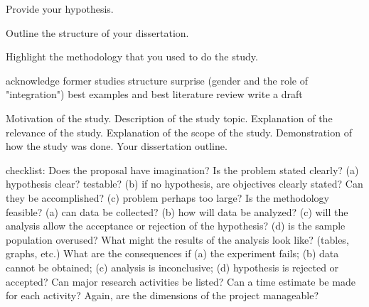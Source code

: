 Provide your hypothesis.

Outline the structure of your dissertation.

Highlight the methodology that you used to do the study.


acknowledge former studies
structure
surprise (gender and the role of "integration")
best examples and best literature review
write a draft

Motivation of the study.
Description of the study topic.
Explanation of the relevance of the study.
Explanation of the scope of the study.
Demonstration of how the study was done.
Your dissertation outline.


checklist:
Does the proposal have imagination?
Is the problem stated clearly?
(a) hypothesis clear? testable?
(b) if no hypothesis, are objectives clearly stated? Can they be accomplished?
(c) problem perhaps too large?
Is the methodology feasible?
(a) can data be collected?
(b) how will data be analyzed?
(c) will the analysis allow the acceptance or rejection of the hypothesis?
(d) is the sample population overused?
What might the results of the analysis look like? (tables, graphs, etc.)
What are the consequences if
(a) the experiment fails;
(b) data cannot be obtained;
(c) analysis is inconclusive;
(d) hypothesis is rejected or accepted?
Can major research activities be listed?
Can a time estimate be made for each activity?
Again, are the dimensions of the project manageable?

\todototoc
\listoftodos